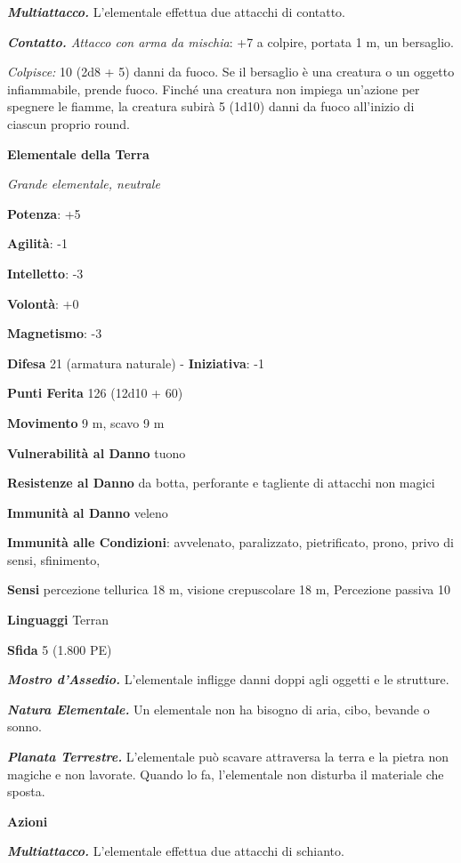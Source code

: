 \begin{multicols}{2}
\emph{\textbf{Multiattacco.}} L'elementale effettua due attacchi di
contatto.

\emph{\textbf{Contatto.} Attacco con arma da mischia}: +7 a colpire,
portata 1 m, un bersaglio.

\emph{Colpisce:} 10 (2d8 + 5) danni da fuoco. Se il bersaglio è una
creatura o un oggetto infiammabile, prende fuoco. Finché una creatura
non impiega un'azione per spegnere le fiamme, la creatura subirà 5
(1d10) danni da fuoco all'inizio di ciascun proprio round.

\textbf{Elementale della Terra}

\emph{Grande elementale, neutrale}

\textbf{Potenza}: +5

\textbf{Agilità}: -1

\textbf{Intelletto}: -3

\textbf{Volontà}: +0

\textbf{Magnetismo}: -3

\textbf{Difesa} 21 (armatura naturale) - \textbf{Iniziativa}: -1

\textbf{Punti Ferita} 126 (12d10 + 60)

\textbf{Movimento} 9 m, scavo 9 m

\textbf{Vulnerabilità al Danno} tuono

\textbf{Resistenze al Danno} da botta, perforante e tagliente di
attacchi non magici

\textbf{Immunità al Danno} veleno

\textbf{Immunità alle Condizioni}: avvelenato, paralizzato, pietrificato,
prono, privo di sensi, sfinimento,

\textbf{Sensi} percezione tellurica 18 m, visione crepuscolare 18 m, Percezione
passiva 10

\textbf{Linguaggi} Terran

\textbf{Sfida} 5 (1.800 PE)\smallskip

\emph{\textbf{Mostro d'Assedio.}} L'elementale infligge danni doppi agli
oggetti e le strutture.

\emph{\textbf{Natura Elementale.}} Un elementale non ha bisogno di aria,
cibo, bevande o sonno.

\emph{\textbf{Planata Terrestre.}} L'elementale può scavare attraversa
la terra e la pietra non magiche e non lavorate. Quando lo fa,
l'elementale non disturba il materiale che sposta.

\smallskip\textbf{Azioni}

\emph{\textbf{Multiattacco.}} L'elementale effettua due attacchi di
schianto.


\end{multicols}
